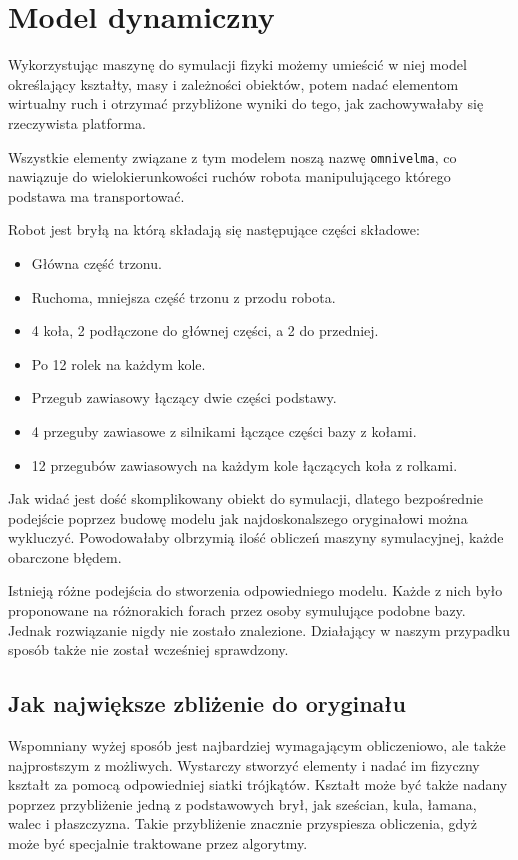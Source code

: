 \section{Model dynamiczny}
Wykorzystując maszynę do symulacji fizyki możemy umieścić w niej model określający kształty, masy i zależności obiektów, potem nadać elementom wirtualny ruch i otrzymać przybliżone wyniki do tego, jak zachowywałaby się rzeczywista platforma.

Wszystkie elementy związane z tym modelem noszą nazwę \texttt{omnivelma}, co nawiązuje do wielokierunkowości ruchów robota manipulującego którego podstawa ma transportować.

Robot jest bryłą na którą składają się następujące części składowe:
\begin{itemize}
 \item Główna część trzonu.
 \item Ruchoma, mniejsza część trzonu z przodu robota.
 \item 4 koła, 2 podłączone do głównej części, a 2 do przedniej.
 \item Po 12 rolek na każdym kole.
 \item Przegub zawiasowy łączący dwie części podstawy.
 \item 4 przeguby zawiasowe z silnikami łączące części bazy z kołami.
 \item 12 przegubów zawiasowych na każdym kole łączących koła z rolkami.
\end{itemize}

Jak widać jest dość skomplikowany obiekt do symulacji, dlatego bezpośrednie podejście poprzez budowę modelu jak najdoskonalszego oryginałowi można wykluczyć.
Powodowałaby olbrzymią ilość obliczeń maszyny symulacyjnej, każde obarczone błędem.

Istnieją różne podejścia do stworzenia odpowiedniego modelu. Każde z nich było proponowane na różnorakich forach przez osoby symulujące podobne bazy.
Jednak rozwiązanie nigdy nie zostało znalezione.
Działający w naszym przypadku sposób także nie został wcześniej sprawdzony.

\subsection{Jak największe zbliżenie do oryginału}
Wspomniany wyżej sposób jest najbardziej wymagającym obliczeniowo, ale także najprostszym z możliwych.
Wystarczy stworzyć elementy i nadać im fizyczny kształt za pomocą odpowiedniej siatki trójkątów.
Kształt może być także nadany poprzez przybliżenie jedną z podstawowych brył, jak sześcian, kula, łamana, walec i płaszczyzna.
Takie przybliżenie znacznie przyspiesza obliczenia, gdyż może być specjalnie traktowane przez algorytmy.

